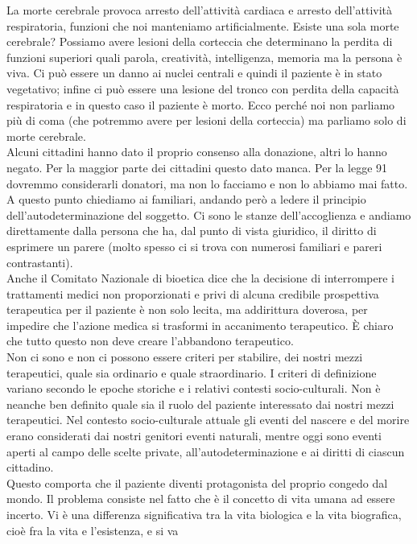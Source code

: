 La morte cerebrale provoca arresto dell'attività cardiaca e arresto
dell'attività respiratoria, funzioni che noi manteniamo artificialmente.
Esiste una sola morte cerebrale? Possiamo avere lesioni della corteccia
che determinano la perdita di funzioni superiori quali parola,
creatività, intelligenza, memoria ma la persona è viva. Ci può essere un
danno ai nuclei centrali e quindi il paziente è in stato vegetativo;
infine ci può essere una lesione del tronco con perdita della capacità
respiratoria e in questo caso il paziente è morto. Ecco perché noi non
parliamo più di coma (che potremmo avere per lesioni della corteccia) ma
parliamo solo di morte cerebrale.
\\
Alcuni cittadini hanno dato il proprio consenso alla donazione, altri lo
hanno negato. Per la maggior parte dei cittadini questo dato manca. Per
la legge 91 dovremmo considerarli donatori, ma non lo facciamo e non lo
abbiamo mai fatto. A questo punto chiediamo ai familiari, andando però a
ledere il principio dell'autodeterminazione del soggetto. Ci sono le
stanze dell'accoglienza e andiamo direttamente dalla persona che ha, dal
punto di vista giuridico, il diritto di esprimere un parere (molto
spesso ci si trova con numerosi familiari e pareri contrastanti).
\\
Anche il Comitato Nazionale di bioetica dice che la decisione di
interrompere i trattamenti medici non proporzionati e privi di alcuna
credibile prospettiva terapeutica per il paziente è non solo lecita, ma
addirittura doverosa, per impedire che l'azione medica si trasformi in
accanimento terapeutico. È chiaro che tutto questo non deve creare
l'abbandono terapeutico.
\\
Non ci sono e non ci possono essere criteri per stabilire, dei nostri
mezzi terapeutici, quale sia ordinario e quale straordinario. I criteri
di definizione variano secondo le epoche storiche e i relativi contesti
socio-culturali. Non è neanche ben definito quale sia il ruolo del
paziente interessato dai nostri mezzi terapeutici. Nel contesto
socio-culturale attuale gli eventi del nascere e del morire erano
considerati dai nostri genitori eventi naturali, mentre oggi sono eventi
aperti al campo delle scelte private, all'autodeterminazione e ai
diritti di ciascun cittadino.
\\
Questo comporta che il paziente diventi protagonista del proprio congedo
dal mondo. Il problema consiste nel fatto che è il concetto di vita
umana ad essere incerto. Vi è una differenza significativa tra la vita
biologica e la vita biografica, cioè fra la vita e l'esistenza, e si va
